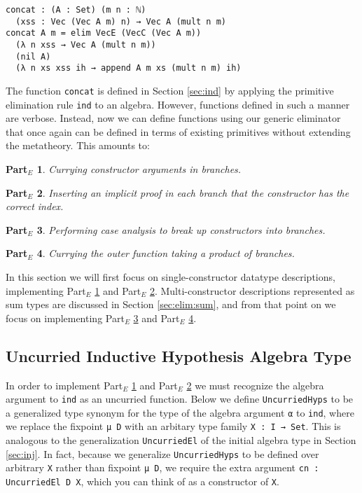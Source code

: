 \documentclass[preprint,nonatbib]{sigplanconf}
\newtheorem{myparte}{Part$_E$}
\newcommand{\refsec}[1]{Section \ref{sec:#1}}
\newcommand{\refparte}[1]{Part$_E$ \ref{parte:#1}}
\begin{document}
\begin{verbatim}
concat : (A : Set) (m n : ℕ)
  (xss : Vec (Vec A m) n) → Vec A (mult n m)
concat A m = elim VecE (VecC (Vec A m))
  (λ n xss → Vec A (mult n m))
  (nil A)
  (λ n xs xss ih → append A m xs (mult n m) ih)
\end{verbatim}

The function {\tt concat} is defined in \refsec{ind} by applying the
primitive elimination rule {\tt ind} to an algebra. However,
functions defined in such a manner are verbose. Instead, now we
can define functions using our generic eliminator that once again can
be defined in terms of existing primitives without extending the
metatheory. This amounts to:

\begin{myparte}
\label{parte:one}
Currying constructor arguments in branches.
\end{myparte}

\begin{myparte}
\label{parte:two}
Inserting an implicit proof in each branch that the constructor has the correct index.
\end{myparte}

\begin{myparte}
\label{parte:three}
Performing case analysis to break up constructors into branches.
\end{myparte}

\begin{myparte}
\label{parte:four}
Currying the outer function taking a product of branches.
\end{myparte}

In this section we will first focus on single-constructor
datatype descriptions, implementing \refparte{one} and \refparte{two}.
Multi-constructor descriptions represented as sum types are
discussed in \refsec{elim:sum}, and from that point on we focus on
implementing \refparte{three} and \refparte{four}.

\subsection{Uncurried Inductive Hypothesis Algebra Type}

In order to implement
\refparte{one} and \refparte{two} we must recognize the algebra
argument to {\tt ind} as an uncurried function.
Below we define {\tt UncurriedHyps} to be a generalized type synonym
for the type of the algebra argument {\tt α} to {\tt ind}, where we
replace the fixpoint
{\tt μ D} with an arbitary type family {\tt X : I → Set}. This is
analogous to the generalization {\tt UncurriedEl} of the initial
algebra type in \refsec{inj}. In fact, because we generalize
{\tt UncurriedHyps} to be defined over arbitrary {\tt X} rather than
fixpoint {\tt μ D}, we require the extra argument
{\tt cn : UncurriedEl D X}, which you can think of as a
constructor of {\tt X}.
\end{document}
